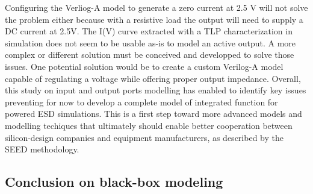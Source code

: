 Configuring the Verliog-A model to generate a zero current at 2.5 V will not solve the problem either because with a resistive load the output will need to supply a DC current at 2.5V.
The I(V) curve extracted with a TLP characterization in simulation does not seem to be usable as-is to model an active output.
A more complex or different solution must be conceived and developped to solve those issues.
One potential solution would be to create a custom Verilog-A model capable of regulating a voltage while offering proper output impedance.
Overall, this study on input and output ports modelling has enabled to identify key issues preventing for now to develop a complete model of integrated function for powered ESD simulations.
This is a first step toward more advanced models and modelling techiques that ultimately should enable better cooperation between silicon-design companies and equipment manufacturers, as described by the SEED methodology.

\subsection{Conclusion on black-box modeling}


